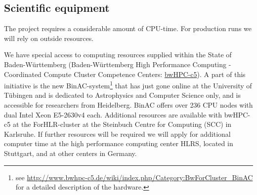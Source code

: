 \documentclass[10pt,fleqn,twoside]{article}
\begin{document}
\subsection{Scientific equipment}

The project requires a considerable amount of CPU-time. For production runs
we will rely on outside resources. 

We have special access to computing resources supplied within the State of
Baden-W\"urttemberg (Baden-W\"urttemberg High Performance Computing -
Coordinated Compute Cluster Competence Centers:
\href{https://www.bwhpc-c5.de}{bwHPC-c5}).  A part of this initiative is the
new BinAC-system\footnote{see
  \url{http://www.bwhpc-c5.de/wiki/index.php/Category:BwForCluster\_BinAC}
  for a detailed description of the hardware.}  that has just gone online at
the University of T\"ubingen and is dedicated to Astrophysics and Computer
Science only, and is accessible for researchers from Heidelberg.  BinAC
offers over 236 CPU nodes with dual Intel Xeon E5-2630v4 each. Additional
resources are available with bwHPC-c5 at the ForHLR-cluster at the Steinbuch
Centre for Computing (SCC) in Karlsruhe.  If further resources will be
required we will apply for additional computer time at the high performance
computing center HLRS, located in Stuttgart, and at other centers in
Germany.



%



\end{document}
